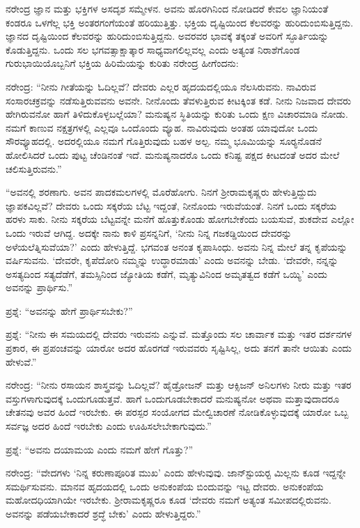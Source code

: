 ನರೇಂದ್ರ ಜ್ಞಾನ ಮತ್ತು ಭಕ್ತಿಗಳ ಅಸದೃಶ ಸಮ್ಮೇಳನ. ಅವನು ಹೊರಗಿನಿಂದ ನೋಡಿದರೆ ಕೇವಲ ಜ್ಞಾನಿಯಂತೆ ಕಂಡರೂ ಒಳಗೆಲ್ಲ ಭಕ್ತಿ ಅಂತರಗಂಗೆಯಂತೆ ಹರಿಯುತ್ತಿತ್ತು. ಭಕ್ತಿಯ ದೃಷ್ಟಿಯಿಂದ ಕೆಲವರನ್ನು ಹುರಿದುಂಬಿಸುತ್ತಿದ್ದನು. ಜ್ಞಾನದ ದೃಷ್ಟಿಯಿಂದ ಕೆಲವರನ್ನು ಹುರಿದುಂಬಿಸುತ್ತಿದ್ದನು. ಅವರವರ ಭಾವಕ್ಕೆ ತಕ್ಕಂತೆ ಅವರಿಗೆ ಸ್ಫೂರ್ತಿಯನ್ನು ಕೊಡುತ್ತಿದ್ದನು. ಒಂದು ಸಲ ಭಗವತ್ಸಾಕ್ಷಾತ್ಕಾರ ಸಾಧ್ಯವಾಗಲಿಲ್ಲವಲ್ಲ ಎಂದು ಅತ್ಯಂತ ನಿರಾಶೆಗೊಂಡ ಗುರುಭಾಯಿಯೊಬ್ಬನಿಗೆ ಭಕ್ತಿಯ ಹಿರಿಮೆಯನ್ನು ಕುರಿತು ನರೇಂದ್ರ ಹೀಗೆಂದನು:

ನರೇಂದ್ರ: “ನೀನು ಗೀತೆಯನ್ನು ಓದಿಲ್ಲವೆ? ದೇವರು ಎಲ್ಲರ ಹೃದಯದಲ್ಲಿಯೂ ನೆಲಸಿರುವನು. ನಾವಿರುವ ಸಂಸಾರಚಕ್ರವನ್ನು ನಡೆಸುತ್ತಿರುವವನು ಅವನೇ. ನೀನೊಂದು ತೆವಳುತ್ತಿರುವ ಕೀಟಕ್ಕಿಂತ ಕಡೆ. ನೀನು ನಿಜವಾದ ದೇವರು ಹೇಗಿರುವನೋ ಹಾಗೆ ತಿಳಿದುಕೊಳ್ಳಬಲ್ಲೆಯಾ? ಮನುಷ್ಯನ ಸ್ಥಿತಿಯನ್ನು ಕುರಿತು ಒಂದು ಕ್ಷಣ ವಿಚಾರಮಾಡಿ ನೋಡು. ನಮಗೆ ಕಾಣುವ ನಕ್ಷತ್ರಗಳಲ್ಲಿ ಎಲ್ಲವೂ ಒಂದೊಂದು ವ್ಯೂಹ. ನಾವಿರುವುದು ಅಂತಹ ಯಾವುದೋ ಒಂದು ಸೌರವ್ಯೂಹದಲ್ಲಿ. ಅದರಲ್ಲಿಯೂ ನಮಗೆ ಗೊತ್ತಿರುವುದು ಬಹಳ ಅಲ್ಪ. ನಮ್ಮ ಭೂಮಿಯನ್ನು ಸೂರ‍್ಯನೊಡನೆ ಹೋಲಿಸಿದರೆ ಒಂದು ಪುಟ್ಟ ಚೆಂಡಿನಂತೆ ಇದೆ. ಮನುಷ್ಯನಾದರೊ ಒಂದು ಕನಿಷ್ಟ ಪಕ್ಷದ ಕೀಟದಂತೆ ಅದರ ಮೇಲೆ ಚಲಿಸುತ್ತಿರುವನು.”

“ಅವನಲ್ಲಿ ಶರಣಾಗು. ಅವನ ಪಾದಕಮಲಗಳಲ್ಲಿ ಮೊರೆಹೋಗು. ನಿನಗೆ ಶ‍್ರೀರಾಮಕೃಷ್ಣರು ಹೇಳುತ್ತಿದ್ದುದು ಜ್ಞಾಪಕವಿಲ್ಲವೆ? ದೇವರು ಒಂದು ಸಕ್ಕರೆಯ ಬೆಟ್ಟ ಇದ್ದಂತೆ, ನೀನೊಂದು ಇರುವೆಯಂತೆ. ನಿನಗೆ ಒಂದು ಸಕ್ಕರೆಯ ಹರಳು ಸಾಕು. ನೀನು ಸಕ್ಕರೆಯ ಬೆಟ್ಟವನ್ನೇ ಮನೆಗೆ ಹೊತ್ತುಕೊಂಡು ಹೋಗಬೇಕೆಂದು ಬಯಸುವೆ, ಶುಕದೇವ ಎಲ್ಲೋ ಒಂದು ಇರುವೆ ಆಗಿದ್ದ. ಅದಕ್ಕೇ ನಾನು ಕಾಳಿ ಪ್ರಸನ್ನನಿಗೆ, ‘ನೀನು ನಿನ್ನ ಗಜಕಡ್ಡಿಯಿಂದ ದೇವರನ್ನು ಅಳೆಯಲೆತ್ನಿಸುವೆಯಾ?’ ಎಂದು ಹೇಳುತ್ತಿದ್ದೆ. ಭಗವಂತ ಅನಂತ ಕೃಪಾಸಿಂಧು. ಅವನು ನಿನ್ನ ಮೇಲೆ ತನ್ನ ಕೃಪೆಯನ್ನು ವರ್ಷಿಸುವನು. ‘ದೇವರೇ, ಕೃಪೆದೋರಿ ನಮ್ಮನ್ನು ಉದ್ಧಾರಮಾಡು’ ಎಂದು ಅವನನ್ನು ಬೇಡು. ‘ದೇವರೇ, ನನ್ನನ್ನು ಅಸತ್ಯದಿಂದ ಸತ್ಯದೆಡೆಗೆ, ತಮಸ್ಸಿನಿಂದ ಜ್ಯೋತಿಯ ಕಡೆಗೆ, ಮೃತ್ಯುವಿನಿಂದ ಅಮೃತತ್ವದ ಕಡೆಗೆ ಒಯ್ಯಿ’ ಎಂದು ಅವನನ್ನು ಪ್ರಾರ್ಥಿಸು.”

ಪ್ರಶ್ನೆ: “ಅವನನ್ನು ಹೇಗೆ ಪ್ರಾರ್ಥಿಸಬೇಕು?”

ಪ್ರಶ್ನೆ: “ನೀನು ಈ ಸಮಯದಲ್ಲಿ ದೇವರು ಇರುವನು ಎನ್ನುವೆ. ಮತ್ತೊಂದು ಸಲ ಚಾರ್ವಾಕ ಮತ್ತು ಇತರ ದರ್ಶನಗಳ ಪ್ರಕಾರ, ಈ ಪ್ರಪಂಚವನ್ನು ಯಾರೋ ಅದರ ಹೊರಗಡೆ ಇರುವವರು ಸೃಷ್ಟಿಸಿಲ್ಲ, ಅದು ತನಗೆ ತಾನೇ ಆಯಿತು ಎಂದು ಹೇಳುವೆ.”

ನರೇಂದ್ರ: “ನೀನು ರಸಾಯನ ಶಾಸ್ತ್ರವನ್ನು ಓದಿಲ್ಲವೆ? ಹೈಡ್ರೋಜನ್ ಮತ್ತು ಆಕ್ಸಿಜನ್ ಅನಿಲಗಳು ನೀರು ಮತ್ತು ಇತರ ವಸ್ತುಗಳಾಗುವುದಕ್ಕೆ ಒಂದುಗೂಡುತ್ತವೆ. ಹಾಗೆ ಒಂದುಗೂಡಬೇಕಾದರೆ ಮನುಷ್ಯನೋ ಅಥವಾ ಮತ್ತಾವುದಾದರೂ ಚೇತನವು ಅವರ ಹಿಂದೆ ಇರಬೇಕು. ಈ ಪರಸ್ಪರ ಸಂಯೋಗದ ಮೇಲ್ವಿಚಾರಣೆ ನೋಡಿಕೊಳ್ಳುವುದಕ್ಕೆ ಯಾರೋ ಒಬ್ಬ ಸರ್ವಜ್ಞ ಅದರ ಹಿಂದೆ ಇರಬೇಕು ಎಂದು ಊಹಿಸಲೇಬೇಕಾಗುವುದು.”

ಪ್ರಶ್ನೆ: “ಅವನು ದಯಾಮಯ ಎಂದು ನಮಗೆ ಹೇಗೆ ಗೊತ್ತು?”

ನರೇಂದ್ರ: “ವೇದಗಳು ‘ನಿನ್ನ ಕರುಣಾಪೂರಿತ ಮುಖ’ ಎಂದು ಹೇಳುವುವು. ಜಾನ್‍ಸ್ಟುಯರ‍್ಟ ಮಿಲ್ಲನು ಕೂಡ ಇದ್ದನ್ನೇ ಸಮರ್ಥಿಸುವನು. ಮಾನವ ಹೃದಯದಲ್ಲಿ ಒಂದು ಅನುಕಂಪೆಯ ಬಿಂದುವನ್ನು ಇಟ್ಟ ದೇವರು. ಅನುಕಂಪೆಯ ಮಹೋದಧಿಯಾಗಿಯೇ ಇರಬೇಕು. ಶ‍್ರೀರಾಮಕೃಷ್ಣರೂ ಕೂಡ ‘ದೇವರು ನಮಗೆ ಅತ್ಯಂತ ಸಮೀಪದಲ್ಲಿರುವನು. ಅವನನ್ನು ಪಡೆಯಬೇಕಾದರೆ ಶ್ರದ್ಧೆ ಬೇಕು’ ಎಂದು ಹೇಳುತ್ತಿದ್ದರು.”

